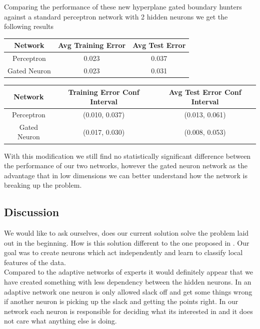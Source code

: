 \documentclass[notitlepage]{report}
\theoremstyle{definition}
\begin{document}
Comparing the performance of these new hyperplane gated boundary hunters against a standard perceptron network with 2 hidden neurons we get the following results

\begin{center}
\begin{tabular}{| c | c | c |}
\hline
Network & Avg Training Error & Avg Test Error \\
\hline
\hline
Perceptron & 0.023 & 0.037 \\
\hline
Gated Neuron & 0.023 & 0.031 \\
\hline
\end{tabular}
\end{center}

\begin{center}
\begin{tabular}{| c | c | c |}
\hline
Network & Training Error Conf Interval & Avg Test Error Conf Interval\\
\hline
\hline
Perceptron & (0.010, 0.037) & (0.013, 0.061)\\
\hline
Gated Neuron & (0.017, 0.030) & (0.008, 0.053)\\
\hline
\end{tabular}
\end{center}

With this modification we still find no statistically significant difference between the performance of our two networks, however the gated neuron network as the advantage that in low dimensions we can better understand how the network is breaking up the problem.

\subsection{Discussion}
We would like to ask ourselves, does our current solution solve the problem laid out in the beginning. How is this solution different to the one proposed in \cite{jacobs1991adaptive}. Our goal was to create neurons which act independently and learn to classify local features of the data.\\

Compared to the adaptive networks of experts it would definitely appear that we have created something with less dependency between the hidden neurons. In an adaptive network one neuron is only allowed slack off and get some things wrong if another neuron is picking up the slack and getting the points right. In our network each neuron is responsible for deciding what its interested in and it does not care what anything else is doing.\\
\end{document}
